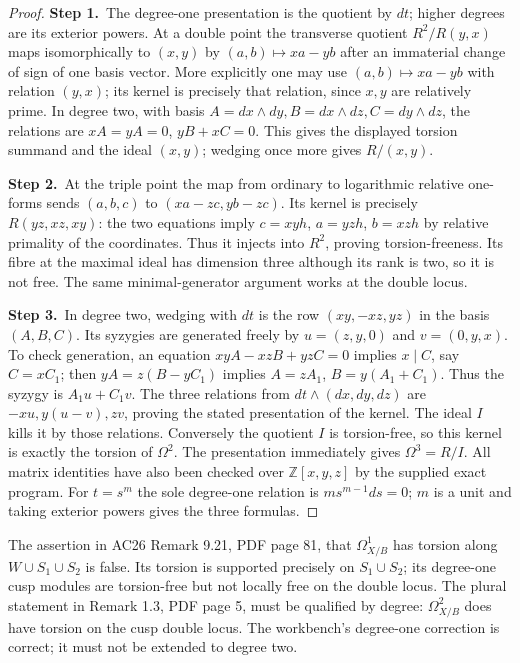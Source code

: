 \begin{proof}
\par\smallskip\noindent\textbf{Step 1.}\ The degree-one presentation is the quotient by $dt$; higher degrees
are its exterior powers.  At a double point the transverse quotient
$R^2/R(y,x)$ maps isomorphically to $(x,y)$ by
$(a,b)\mapsto xa-yb$ after an immaterial change of sign of one
basis vector.  More explicitly one may use
$(a,b)\mapsto xa-yb$ with relation $(y,x)$; its kernel is precisely
that relation, since $x,y$ are relatively prime.  In degree two,
with basis $A=dx\wedge dy,B=dx\wedge dz,C=dy\wedge dz$, the
relations are $xA=yA=0$, $yB+xC=0$.  This gives the displayed
torsion summand and the ideal $(x,y)$; wedging once more gives
$R/(x,y)$.

\par\smallskip\noindent\textbf{Step 2.}\ At the triple point the map from ordinary to logarithmic relative
one-forms sends $(a,b,c)$ to $(xa-zc,yb-zc)$.
Its kernel is precisely $R(yz,xz,xy)$: the two equations imply
$c=xyh$, $a=yzh$, $b=xzh$ by relative primality of the coordinates.
Thus it injects into $R^2$, proving torsion-freeness.  Its fibre at
the maximal ideal has dimension three although its rank is two,
so it is not free.  The same minimal-generator argument works at
the double locus.

\par\smallskip\noindent\textbf{Step 3.}\ In degree two, wedging with $dt$ is the row
$(xy,-xz,yz)$ in the basis $(A,B,C)$.
Its syzygies are generated freely by
$u=(z,y,0)$ and $v=(0,y,x)$.
To check generation, an equation $xyA-xzB+yzC=0$ implies
$x\mid C$, say $C=xC_1$; then $yA=z(B-yC_1)$ implies
$A=zA_1$, $B=y(A_1+C_1)$.  Thus the syzygy is $A_1u+C_1v$.
The three relations from $dt\wedge(dx,dy,dz)$ are
$-xu,y(u-v),zv$, proving the stated presentation of the kernel.
The ideal $I$ kills it by those relations.  Conversely the quotient
$I$ is torsion-free, so this kernel is exactly the torsion of
$\Omega^2$.  The presentation immediately gives $\Omega^3=R/I$.
All matrix identities have also been checked over $\mathbb Z[x,y,z]$ by
the supplied exact program.  For $t=s^m$ the sole degree-one
relation is $ms^{m-1}ds=0$; $m$ is a unit and taking exterior
powers gives the three formulas.
\end{proof}

\begin{remark}\label{inv:A4.2}
The assertion in AC26 Remark 9.21, PDF page 81, that
$\Omega_{X/B}^1$ has torsion along $W\cup S_1\cup S_2$ is false.
Its torsion is supported precisely on $S_1\cup S_2$; its degree-one
cusp modules are torsion-free but not locally free on the double
locus.  The plural statement in Remark 1.3, PDF page 5, must be
qualified by degree: $\Omega^2_{X/B}$ does have torsion on the cusp
double locus.  The workbench's degree-one correction is correct;
it must not be extended to degree two.
\end{remark}

